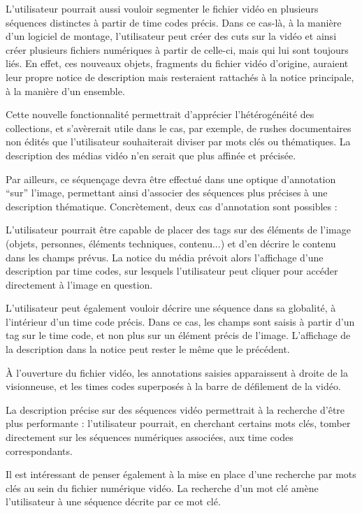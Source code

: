 L’utilisateur pourrait aussi vouloir segmenter le fichier vidéo en plusieurs séquences distinctes à partir de time codes précis. Dans ce cas-là, à la manière d’un logiciel de montage, l’utilisateur peut créer des cuts sur la vidéo et ainsi créer plusieurs fichiers numériques à partir de celle-ci, mais qui lui sont toujours liés. En effet, ces nouveaux objets, fragments du fichier vidéo d’origine, auraient leur propre notice de description mais resteraient rattachés à la notice principale, à la manière d’un ensemble.  

Cette nouvelle fonctionnalité permettrait d’apprécier l’hétérogénéité des collections, et s’avèrerait utile dans le cas, par exemple, de rushes documentaires non édités que l’utilisateur souhaiterait diviser par mots clés ou thématiques. La description des médias vidéo n’en serait que plus affinée et précisée.  

Par ailleurs, ce séquençage devra être effectué dans une optique d’annotation “sur” l’image, permettant ainsi d’associer des séquences plus précises à une description thématique. Concrètement, deux cas d’annotation sont possibles :  

L’utilisateur pourrait être capable de placer des tags sur des éléments de l’image (objets, personnes, éléments techniques, contenu...) et d’en décrire le contenu dans les champs prévus. La notice du média prévoit alors l’affichage d’une description par time codes, sur lesquels l’utilisateur peut cliquer pour accéder directement à l'image en question.  

L’utilisateur peut également vouloir décrire une séquence dans sa globalité, à l’intérieur d’un time code précis. Dans ce cas, les champs sont saisis à partir d’un tag sur le time code, et non plus sur un élément précis de l’image.  L’affichage de la description dans la notice peut rester le même que le précédent.  

À l’ouverture du fichier vidéo, les annotations saisies apparaissent à droite de la visionneuse, et les times codes superposés à la barre de défilement de la vidéo.  

La description précise sur des séquences vidéo permettrait à la recherche d’être plus performante : l’utilisateur pourrait, en cherchant certains mots clés, tomber directement sur les séquences numériques associées, aux time codes correspondants. 

Il est intéressant de penser également à la mise en place d’une recherche par mots clés au sein du fichier numérique vidéo. La recherche d’un mot clé amène l’utilisateur à une séquence décrite par ce mot clé.   

